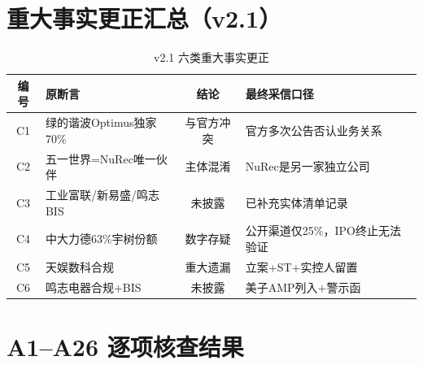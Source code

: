 \section{重大事实更正汇总（v2.1）}

\begin{table}[H]
\centering\scriptsize
\renewcommand{\arraystretch}{1.1}
\begin{tabularx}{\textwidth}{c X c X}
\toprule
\textbf{编号} & \textbf{原断言} & \textbf{结论} & \textbf{最终采信口径} \\
\midrule
C1 & 绿的谐波Optimus独家70\% & \textcolor{riskred}{与官方冲突} & 官方多次公告否认业务关系 \\
C2 & 五一世界=NuRec唯一伙伴 & \textcolor{riskred}{主体混淆} & NuRec是另一家独立公司 \\
C3 & 工业富联/新易盛/鸣志BIS & 未披露 & 已补充实体清单记录 \\
C4 & 中大力德63\%宇树份额 & \textcolor{riskred}{数字存疑} & 公开渠道仅25\%，IPO终止无法验证 \\
C5 & 天娱数科合规 & \textcolor{riskred}{重大遗漏} & 立案+ST+实控人留置 \\
C6 & 鸣志电器合规+BIS & 未披露 & 美子AMP列入+警示函 \\
\bottomrule
\end{tabularx}
\caption{v2.1 六类重大事实更正}
\end{table}

\section{A1--A26 逐项核查结果}

